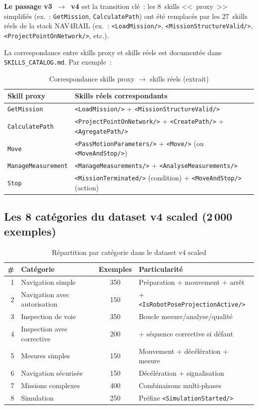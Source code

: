 \documentclass[a4paper,11pt]{article}
\newcommand{\file}[1]{\texttt{#1}}
\newcommand{\skill}[1]{\texttt{<#1/>}}
\begin{document}
\textbf{Le passage v3~$\rightarrow$~v4} est la transition clé~: les 8~skills
<<~proxy~>> simplifiés (ex.~: \texttt{GetMission}, \texttt{CalculatePath})
ont été remplacés par les 27~skills réels de la stack NAV4RAIL (ex.~:
\skill{LoadMission}, \skill{MissionStructureValid},
\skill{ProjectPointOnNetwork}, etc.).

La correspondance entre skills proxy et skills réels est documentée dans
\file{SKILLS\_CATALOG.md}. Par exemple~:

\begin{table}[h]
\centering
\caption{Correspondance skills proxy $\rightarrow$ skills réels (extrait)}
\begin{tabular}{@{}l l@{}}
\toprule
\textbf{Skill proxy} & \textbf{Skills réels correspondants} \\
\midrule
\texttt{GetMission} & \skill{LoadMission} + \skill{MissionStructureValid} \\
\texttt{CalculatePath} & \skill{ProjectPointOnNetwork} +
\skill{CreatePath} + \skill{AgregatePath} \\
\texttt{Move} & \skill{PassMotionParameters} + \skill{Move} (ou
\skill{MoveAndStop}) \\
\texttt{ManageMeasurement} & \skill{ManageMeasurements} +
\skill{AnalyseMeasurements} \\
\texttt{Stop} & \skill{MissionTerminated} (condition) +
\skill{MoveAndStop} (action) \\
\bottomrule
\end{tabular}
\end{table}

\subsection{Les 8 catégories du dataset v4 scaled (2\,000 exemples)}

\begin{table}[h]
\centering
\caption{Répartition par catégorie dans le dataset v4 scaled}
\begin{tabular}{@{}r l c l@{}}
\toprule
\textbf{\#} & \textbf{Catégorie} & \textbf{Exemples} &
\textbf{Particularité} \\
\midrule
1 & Navigation simple & 350 & Préparation + mouvement + arrêt \\
2 & Navigation avec autorisation & 150 & +
\skill{IsRobotPoseProjectionActive} \\
3 & Inspection de voie & 350 & Boucle mesure/analyse/qualité \\
4 & Inspection avec corrective & 200 & + séquence corrective si défaut \\
5 & Mesures simples & 150 & Mouvement + décélération + mesure \\
6 & Navigation sécurisée & 150 & Décélération + signalisation \\
7 & Missions complexes & 400 & Combinaisons multi-phases \\
8 & Simulation & 250 & Préfixe \skill{SimulationStarted} \\
\bottomrule
\end{tabular}
\end{table}
\end{document}
